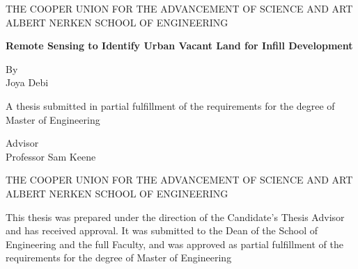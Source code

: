 \documentclass[12pt,letterpaper]{report}
\begin{document}

\thispagestyle{empty}
\begin{center}

\begin{center}
THE COOPER UNION FOR THE ADVANCEMENT OF SCIENCE AND ART\\
ALBERT NERKEN SCHOOL OF ENGINEERING
\end{center}

\vspace{2in}

{\Huge \textbf{Remote Sensing to Identify Urban Vacant Land
for Infill Development}}

\vspace{0.5in}
By \\
{\Large Joya Debi}

\vspace{2.5in}

\begin{minipage}{0.8\textwidth}
\centering
A thesis submitted in partial fulfillment of the requirements for the degree of
Master of Engineering
\end{minipage}
\vspace{0.5in}

Advisor \\
Professor Sam Keene

\vspace{0.5in}

\end{center}
\clearpage

\thispagestyle{empty}

\begin{center}
THE COOPER UNION FOR THE ADVANCEMENT OF SCIENCE AND ART\\
ALBERT NERKEN SCHOOL OF ENGINEERING
\end{center}

\vspace{2in}

\noindent This thesis was prepared under the direction of the Candidate's Thesis Advisor and has
received approval. It was submitted to the Dean of the School of Engineering and the
full Faculty, and was approved as partial fulfillment of the requirements for the degree
of Master of Engineering
\end{document}
